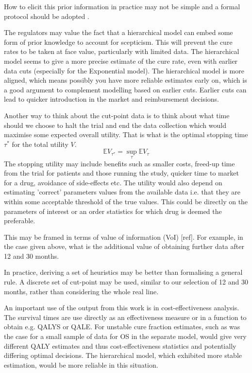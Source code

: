 \documentclass[AMA,STIX1COL]{WileyNJD-v2}
\begin{document}
How to elicit this prior information in practice may not be simple and a formal protocol should be adopted \cite{OHagan2019}.


The regulators may value the fact that a hierarchical model can embed some form of prior knowledge to account for scepticism.
This will prevent the cure rates to be taken at face value, particularly with limited data.
The hierarchical model seems to give a more precise estimate of the cure rate, even with earlier data cuts (especially for the Exponential model).
The hierarchical model is more aligned, which means possibly you have more reliable estimates early on, which is a good argument to complement modelling based on earlier cuts.
Earlier cuts can lead to quicker introduction in the market and reimbursement decisions.

Another way to think about the cut-point data is to think about what time should we choose to halt the trial and end the data collection which would maximise some expected overall utility.
That is what is the optimal stopping time $\tau^*$ for the total utility $V$.
$$
\mathbb{E} V_{\tau^*} = \sup_{\tau} \mathbb{E} V_{\tau}
$$
The stopping utility may include benefits such as smaller costs, freed-up time from the trial for patients and those running the study, quicker time to market for a drug, avoidance of side-effects etc.
The utility would also depend on estimating 'correct' parameters values from the available data i.e. that they are within some acceptable threshold of the true values.
This could be directly on the parameters of interest or an order statistics for which drug is deemed the preferable.

This may be framed in terms of value of information (VoI) [ref].
For example, in the case given above, what is the additional value of obtaining further data after 12 and 30 months.

In practice, deriving a set of heuristics may be better than formalising a general rule.
A discrete set of cut-point may be used, similar to our selection of 12 and 30 months, rather than considering the whole real line.

An important use of the output from this work is in cost-effectiveness analysis.
The survival times are use directly as an effectiveness measure or in a function to obtain e.g. QALYS or QALE. For unstable cure fraction estimates, such as was the case for a small sample of data for OS in the separate model, would give very different QALY estimates and thus cost-effectiveness statistics and potentially differing optimal decisions.
The hierarchical model, which exhibited more stable estimation, would be more reliable in this situation.
\end{document}

